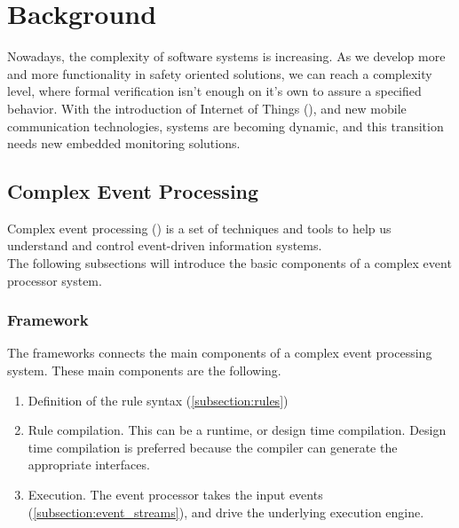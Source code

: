 \chapter{Background}
\label{chap:background}

Nowadays, the complexity of software systems is increasing. As we develop more and more functionality in safety oriented solutions, we can reach a complexity level, where formal verification isn't enough on it's own to assure a specified behavior. With the introduction of Internet of Things (\iot), and new mobile communication technologies, systems are becoming dynamic, and this transition needs new embedded monitoring solutions.

\section{Complex Event Processing}

Complex event processing (\cep) is a set of techniques and tools to help us understand and control event-driven information systems.\citep{Luckham:2001:PEI:515781}
\\[2ex]
The following subsections will introduce the basic components of a complex event processor system.
\subsection{Framework}
The frameworks connects the main components of a complex event processing system. These main components are the following.
\begin{enumerate}
	\item Definition of the rule syntax (\cref{subsection:rules})
	\item Rule compilation. This can be a runtime, or design time compilation. Design time compilation is preferred because the compiler can generate the appropriate interfaces.
	\item Execution. The event processor takes the input events (\cref{subsection:event_streams}), and drive the underlying execution engine.
\end{enumerate}

